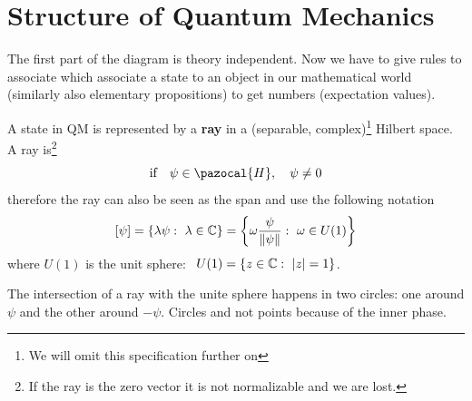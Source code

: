 \documentclass[../main.tex]{subfiles}
\begin{document}
\section[Structure of QM]{Structure of Quantum Mechanics}
The first part of the diagram  is theory independent. Now we have to give rules to associate which associate a state to an object in our mathematical world (similarly also elementary propositions) to get numbers (expectation values).
\begin{definition}
A state in QM is represented by a \textbf{ray} in a (separable, complex)\footnote{We will omit this specification further on} Hilbert space. A ray is\footnote{If the ray is the zero vector it is not normalizable and we are lost.}
\[
\textrm{if} \quad \psi \in \pazocal{H}, \quad \psi \neq 0
\]
therefore the ray can also be seen as the span and use the following notation
\[
\qty[\psi] = \left\{\lambda \psi : \ \lambda\in\mathbb{C}\right \} = \left\{\omega \frac{\psi}{\norm{\psi}} : \ \omega \in U(1)\right \}
\]
where $U(1)$ is the unit sphere: \ \( U(1) = \left\{z\in\mathbb{C} : \ \abs{z}=1\right\}\).
\end{definition}
\begin{kaobox}[frametitle=Nota]
The intersection of a ray with the unite sphere happens in two circles: one around $\psi$ and the other around $-\psi$. Circles and not points because of the inner phase.
\end{kaobox}
\end{document}
